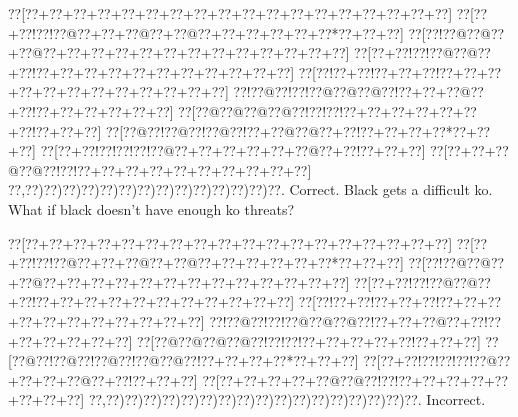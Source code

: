 \documentclass[a5paper]{article}
\begin{document}
\begin{center}
{\goo
\0??[\0??+\0??+\0??+\0??+\0??+\0??+\0??+\0??+\0??+\0??+\0??+\0??+\0??+\0??+\0??+\0??+\0??+\0??]
\0??[\0??+\0??!\0??!\0??@\0??+\0??+\0??@\0??+\0??@\0??+\0??+\0??+\0??+\0??+\0??*\0??+\0??+\0??]
\0??[\0??!\0??@\0??@\0??+\0??@\0??+\0??+\0??+\0??+\0??+\0??+\0??+\0??+\0??+\0??+\0??+\0??+\0??]
\0??[\0??+\0??!\0??!\0??@\0??@\0??+\0??!\0??+\0??+\0??+\0??+\0??+\0??+\0??+\0??+\0??+\0??+\0??]
\0??[\0??!\0??+\0??!\0??+\0??+\0??!\0??+\0??+\0??+\0??+\0??+\0??+\0??+\0??+\0??+\0??+\0??+\0??]
\0??!\0??@\0??!\0??!\0??@\0??@\0??@\0??!\0??+\0??+\0??@\0??+\0??!\0??+\0??+\0??+\0??+\0??+\0??]
\0??[\0??@\0??@\0??@\0??@\0??!\0??!\0??!\0??+\0??+\0??+\0??+\0??+\0??+\0??!\0??+\0??+\0??]
\0??[\0??@\0??!\0??@\0??!\0??@\0??!\0??+\0??@\0??@\0??+\0??!\0??+\0??+\0??+\0??*\0??+\0??+\0??]
\0??[\0??+\0??!\0??!\0??!\0??!\0??@\0??+\0??+\0??+\0??+\0??+\0??@\0??+\0??!\0??+\0??+\0??]
\0??[\0??+\0??+\0??@\0??@\0??!\0??!\0??+\0??+\0??+\0??+\0??+\0??+\0??+\0??+\0??+\0??]
\0??,\0??)\0??)\0??)\0??)\0??)\0??)\0??)\0??)\0??)\0??)\0??)\0??)\0??)\0??.
}
Correct. Black gets a difficult ko. What if black doesn't have enough ko threats?

\end{center}
\begin{center}
{\goo
\0??[\0??+\0??+\0??+\0??+\0??+\0??+\0??+\0??+\0??+\0??+\0??+\0??+\0??+\0??+\0??+\0??+\0??+\0??]
\0??[\0??+\0??!\0??!\0??@\0??+\0??+\0??@\0??+\0??@\0??+\0??+\0??+\0??+\0??+\0??*\0??+\0??+\0??]
\0??[\0??!\0??@\0??@\0??+\0??@\0??+\0??+\0??+\0??+\0??+\0??+\0??+\0??+\0??+\0??+\0??+\0??+\0??]
\0??[\0??+\0??!\0??!\0??@\0??@\0??+\0??!\0??+\0??+\0??+\0??+\0??+\0??+\0??+\0??+\0??+\0??+\0??]
\0??[\0??!\0??+\0??!\0??+\0??+\0??!\0??+\0??+\0??+\0??+\0??+\0??+\0??+\0??+\0??+\0??+\0??]
\0??!\0??@\0??!\0??!\0??@\0??@\0??@\0??!\0??+\0??+\0??@\0??+\0??!\0??+\0??+\0??+\0??+\0??+\0??]
\0??[\0??@\0??@\0??@\0??@\0??!\0??!\0??!\0??+\0??+\0??+\0??+\0??!\0??+\0??+\0??]
\0??[\0??@\0??!\0??@\0??!\0??@\0??!\0??@\0??@\0??!\0??+\0??+\0??+\0??*\0??+\0??+\0??]
\0??[\0??+\0??!\0??!\0??!\0??!\0??@\0??+\0??+\0??+\0??@\0??+\0??!\0??+\0??+\0??]
\0??[\0??+\0??+\0??+\0??+\0??@\0??@\0??!\0??!\0??+\0??+\0??+\0??+\0??+\0??+\0??+\0??]
\0??,\0??)\0??)\0??)\0??)\0??)\0??)\0??)\0??)\0??)\0??)\0??)\0??)\0??)\0??)\0??)\0??)\0??.
}
Incorrect. 

\end{center}
\end{document}
